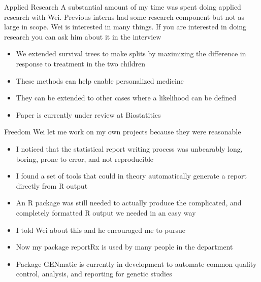 \documentclass[pdf]{beamer}
\theoremstyle{definition}
\begin{document}
\begin{frame}{Applied Research}
A substantial amount of my time was spent doing applied research with Wei. Previous interns had some research component but not as large in scope. Wei is interested in many things. If you are interested in doing research you can ask him about it in the interview
\begin{itemize}
\item We extended survival trees to make splits by maximizing the difference in response to treatment in the two children
\item These methods can help enable personalized medicine
\item They can be extended to other cases where a likelihood can be defined
\item Paper is currently under review at Biostatitics

\end{itemize}

\end{frame}


\begin{frame}{Freedom}
Wei let me work on my own projects because they were reasonable
\begin{itemize}
 
\item I noticed that the statistical report writing process was unbearably long, boring, prone to error, and not reproducible
\item I found a set of tools that could in theory automatically generate a report directly from R output
\item An R package was still needed to actually produce the complicated, and completely formatted R output we needed in an easy way
\item I told Wei about this and he encouraged me to pursue
\item Now my package reportRx is used by many people in the department
\item Package GENmatic is currently in development to automate common quality control, analysis, and reporting for genetic studies

\end{itemize}
\end{frame}
\end{document}
